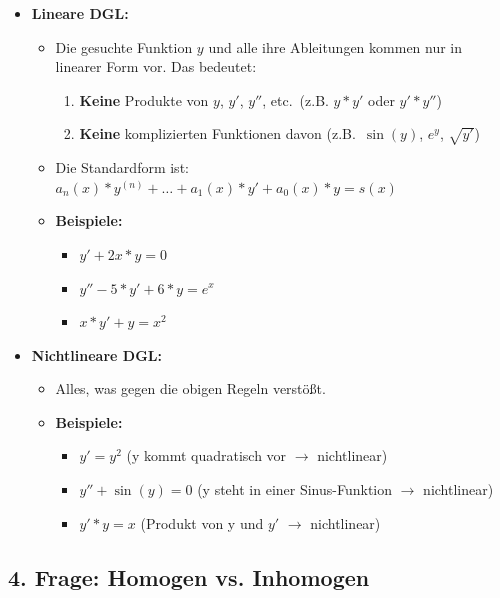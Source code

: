 \documentclass[a4paper,11pt,oneside,open=any,parskip=half, DIV=15]{scrreprt}
\begin{document}
      \begin{itemize}
         \item \textbf{Lineare DGL:}
         \begin{itemize}
            \item Die gesuchte Funktion \(y\) und alle ihre Ableitungen kommen nur in linearer Form vor. Das bedeutet:
            \begin{enumerate}
                  \item \textbf{Keine} Produkte von \(y\), \(y'\), \(y''\), etc.\ (z.B. \(y*y'\) oder \(y'*y''\))
                  \item \textbf{Keine} komplizierten Funktionen davon (z.B.\ \(\sin(y)\), \(e^y\), \(\sqrt{y'}\))
            \end{enumerate}
            \item Die Standardform ist: \(a_n(x)*y^{(n)} + \ldots + a_1(x)*y' + a_0(x)*y = s(x)\)  %
            \item \textbf{Beispiele:}
            \begin{itemize}
                  \item \(y' + 2x*y = 0\) 
                  \item \(y'' - 5*y' + 6*y = e^x\)
                  \item \(x*y' + y = x^2\)
            \end{itemize}
         \end{itemize}
         
         \item \textbf{Nichtlineare DGL:}
         \begin{itemize}
            \item Alles, was gegen die obigen Regeln verstößt.
            \item \textbf{Beispiele:}
            \begin{itemize}
                  \item \(y' = y^2\) (y kommt quadratisch vor \(\rightarrow\) nichtlinear)
                  \item \(y'' + \sin(y) = 0\) (y steht in einer Sinus-Funktion \(\rightarrow\) nichtlinear)
                  \item \(y' * y = x\) (Produkt von y und \(y'\) \(\rightarrow\) nichtlinear)
            \end{itemize}
         \end{itemize}
      \end{itemize}

   \subsection*{4. Frage: Homogen vs. Inhomogen}
\end{document}
